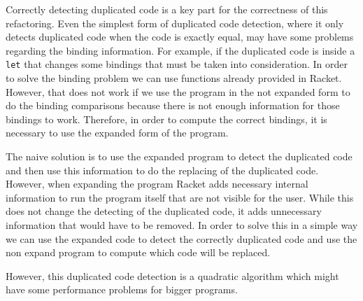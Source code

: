 Correctly detecting duplicated code is a key part for the correctness of this refactoring.
Even the simplest form of duplicated code detection, where it only detects duplicated code
when the code is exactly equal, may have some problems regarding the binding information.
For example, if the duplicated code is inside a {\tt let} that changes some bindings that must
be taken into consideration.
In order to solve the binding problem we can use functions already provided in Racket.
However, that does not work if we use the program in the not expanded
form to do the binding comparisons because there is not enough information for those bindings to work.
Therefore, in order to compute the correct bindings, it is necessary to use the expanded form
of the program.

The naive solution is to use the expanded program to detect the duplicated
 code and then use this information to do the replacing of the duplicated code.
However, when expanding the program Racket adds necessary internal information to
run the program itself that are not visible for the user.
While this does not change the detecting of the duplicated code, it adds unnecessary information
that would have to be removed.
In order to solve this in a simple way we can use the expanded code to detect
the correctly duplicated code and use the non expand program
to compute which code will be replaced.

However, this duplicated code detection is a quadratic algorithm which might
have some performance problems for bigger programs.

